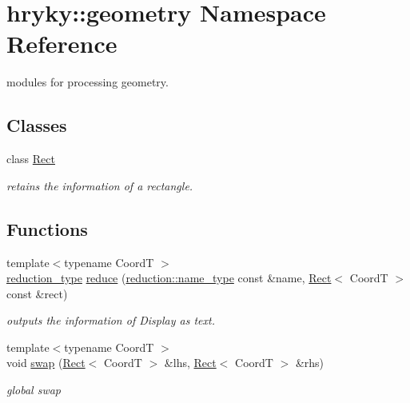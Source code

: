 \hypertarget{namespacehryky_1_1geometry}{\section{hryky\-:\-:geometry Namespace Reference}
\label{namespacehryky_1_1geometry}
}


modules for processing geometry.  


\subsection*{Classes}
\begin{DoxyCompactItemize}
\item 
class \hyperlink{classhryky_1_1geometry_1_1_rect}{Rect}
\begin{DoxyCompactList}\small\item\em retains the information of a rectangle. \end{DoxyCompactList}\end{DoxyCompactItemize}
\subsection*{Functions}
\begin{DoxyCompactItemize}
\item 
\hypertarget{namespacehryky_1_1geometry_a18354ece30244aa68fc3744f2cdb41fc}{{\footnotesize template$<$typename Coord\-T $>$ }\\\hyperlink{namespacehryky_a343a9a4c36a586be5c2693156200eadc}{reduction\-\_\-type} \hyperlink{namespacehryky_1_1geometry_a18354ece30244aa68fc3744f2cdb41fc}{reduce} (\hyperlink{namespacehryky_1_1reduction_ac686c30a4c8d196bbd0f05629a6b921f}{reduction\-::name\-\_\-type} const \&name, \hyperlink{classhryky_1_1geometry_1_1_rect}{Rect}$<$ Coord\-T $>$ const \&rect)}\label{namespacehryky_1_1geometry_a18354ece30244aa68fc3744f2cdb41fc}

\begin{DoxyCompactList}\small\item\em outputs the information of Display as text. \end{DoxyCompactList}\item 
{\footnotesize template$<$typename Coord\-T $>$ }\\void \hyperlink{namespacehryky_1_1geometry_a73028b267b1f3811ebacb86acbee6742}{swap} (\hyperlink{classhryky_1_1geometry_1_1_rect}{Rect}$<$ Coord\-T $>$ \&lhs, \hyperlink{classhryky_1_1geometry_1_1_rect}{Rect}$<$ Coord\-T $>$ \&rhs)
\begin{DoxyCompactList}\small\item\em global swap \end{DoxyCompactList}\end{DoxyCompactItemize}


